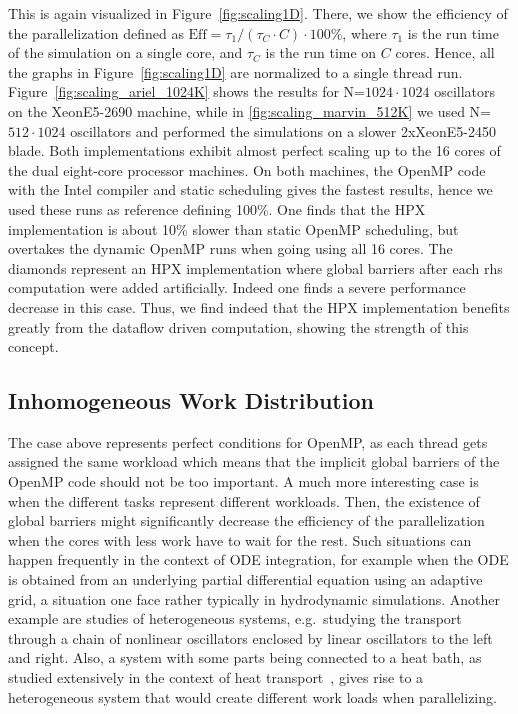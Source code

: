 \documentclass[10pt]{elsarticle}
\begin{document}
This is again visualized in Figure~\ref{fig:scaling1D}.
There, we show the efficiency of the parallelization defined as $\text{Eff} = \tau_1/(\tau_C\cdot C) \cdot100\%$, where $\tau_1$ is the run time of the simulation on a single core, and $\tau_C$ is the run time on $C$ cores.
Hence, all the graphs in Figure~\ref{fig:scaling1D} are normalized to a single thread run.
Figure~\ref{fig:scaling_ariel_1024K} shows the results for N=$1024\cdot1024$ oscillators on the XeonE5-2690 machine, while in \ref{fig:scaling_marvin_512K} we used N=$512\cdot1024$ oscillators and performed the simulations on a slower 2xXeonE5-2450 blade.
Both implementations exhibit almost perfect scaling up to the 16 cores of the dual eight-core processor machines.
On both machines, the OpenMP code with the Intel compiler and static scheduling gives the fastest results, hence we used these runs as reference defining 100\%.
One finds that the HPX implementation is about 10\% slower than static OpenMP scheduling, but overtakes the dynamic OpenMP runs when going using all 16 cores.
The diamonds represent an HPX implementation where global barriers after each rhs computation were added artificially.
Indeed one finds a severe performance decrease in this case.
Thus, we find indeed that the HPX implementation benefits greatly from the dataflow driven computation, showing the strength of this concept.

\subsection{Inhomogeneous Work Distribution}

The case above represents perfect conditions for OpenMP, as each thread gets assigned the same workload which means that the implicit global barriers of the OpenMP code should not be too important.
A much more interesting case is when the different tasks represent different workloads.
Then, the existence of global barriers might significantly decrease the efficiency of the parallelization when the cores with less work have to wait for the rest.
Such situations can happen frequently in the context of ODE integration, for example when the ODE is obtained from an underlying partial differential equation using an adaptive grid, a situation one face rather typically in hydrodynamic simulations.
Another example are studies of heterogeneous systems, e.g.\ studying the transport through a chain of nonlinear oscillators enclosed by linear oscillators to the left and right.
Also, a system with some parts being connected to a heat bath, as studied extensively in the context of heat transport~\cite{Lepri_Livi_Politi_03}, gives rise to a heterogeneous system that would create different work loads when parallelizing.
\end{document}
